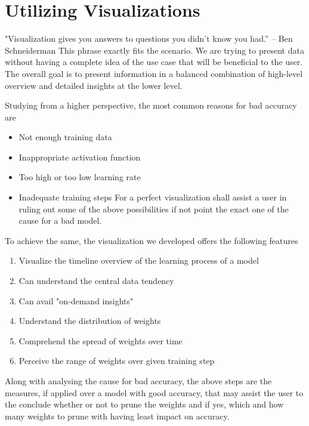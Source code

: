 \documentclass[journal]{vgtc}                %
\begin{document}
\section{Utilizing Visualizations}
"Visualization gives you answers to questions you didn't know you had.” – Ben Schneiderman
This phrase exactly fits the scenario. We are trying to present data without having a complete idea of the use case that will be beneficial to the user. The overall goal is to present information in a balanced combination of high-level overview and detailed insights at the lower level.

Studying from a higher perspective, the most common reasons for bad accuracy \cite{ml_flaw1} \cite{ml_flaw2} are 
\begin{itemize}
\item Not enough training data 
\item Inappropriate activation function 
\item Too high or too low learning rate 
\item Inadequate training steps 
For a perfect visualization shall assist a user in ruling out some of the above possibilities if not point the exact one of the cause for a bad model.
\end{itemize}

To achieve the same, the visualization we developed offers the following features 
\begin{enumerate}
\item Visualize the timeline overview of the learning process of a model 
\item Can understand the central data tendency
\item Can avail "on-demand insights" 
\item Understand the distribution of weights 
\item Comprehend the spread of weights over time 
\item Perceive the range of weights over given training step
\end{enumerate}

Along with analysing the cause for bad accuracy, the above steps are the measures, if applied over a model with good accuracy, that may assist the user to the conclude whether or not to prune the weights and if yes, which and how many weights to prune with having least impact on accuracy.

\end{document}

